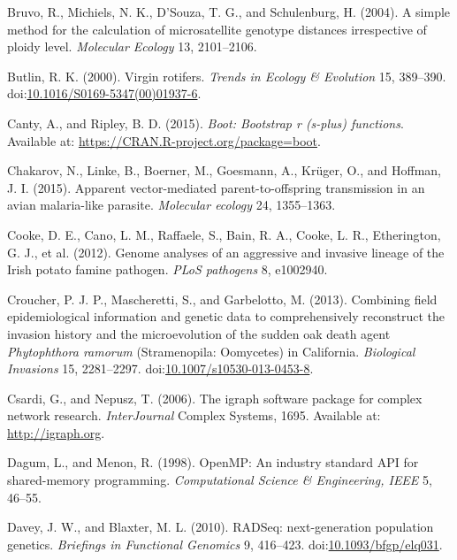 \documentclass[double,12pt]{beavtex}
\begin{document}
  \hypertarget{ref-bruvo2004simple}{}
  Bruvo, R., Michiels, N. K., D'Souza, T. G., and Schulenburg, H. (2004).
  A simple method for the calculation of microsatellite genotype distances
  irrespective of ploidy level. \emph{Molecular Ecology} 13, 2101--2106.
  
  \hypertarget{ref-butlin2000virgin}{}
  Butlin, R. K. (2000). Virgin rotifers. \emph{Trends in Ecology \&
  Evolution} 15, 389--390.
  doi:\href{https://doi.org/10.1016/S0169-5347(00)01937-6}{10.1016/S0169-5347(00)01937-6}.
  
  \hypertarget{ref-canty2015boot}{}
  Canty, A., and Ripley, B. D. (2015). \emph{Boot: Bootstrap r (s-plus)
  functions}. Available at: \url{https://CRAN.R-project.org/package=boot}.
  
  \hypertarget{ref-chakarov2015apparent}{}
  Chakarov, N., Linke, B., Boerner, M., Goesmann, A., Krüger, O., and
  Hoffman, J. I. (2015). Apparent vector-mediated parent-to-offspring
  transmission in an avian malaria-like parasite. \emph{Molecular ecology}
  24, 1355--1363.
  
  \hypertarget{ref-cooke2012genome}{}
  Cooke, D. E., Cano, L. M., Raffaele, S., Bain, R. A., Cooke, L. R.,
  Etherington, G. J., et al. (2012). Genome analyses of an aggressive and
  invasive lineage of the Irish potato famine pathogen. \emph{PLoS
  pathogens} 8, e1002940.
  
  \hypertarget{ref-croucher2013combining}{}
  Croucher, P. J. P., Mascheretti, S., and Garbelotto, M. (2013).
  Combining field epidemiological information and genetic data to
  comprehensively reconstruct the invasion history and the microevolution
  of the sudden oak death agent \emph{Phytophthora ramorum} (Stramenopila:
  Oomycetes) in California. \emph{Biological Invasions} 15, 2281--2297.
  doi:\href{https://doi.org/10.1007/s10530-013-0453-8}{10.1007/s10530-013-0453-8}.
  
  \hypertarget{ref-csardi2006igraph}{}
  Csardi, G., and Nepusz, T. (2006). The igraph software package for
  complex network research. \emph{InterJournal} Complex Systems, 1695.
  Available at: \url{http://igraph.org}.
  
  \hypertarget{ref-dagum1998openmp}{}
  Dagum, L., and Menon, R. (1998). OpenMP: An industry standard API for
  shared-memory programming. \emph{Computational Science \& Engineering,
  IEEE} 5, 46--55.
  
  \hypertarget{ref-davey2010rad}{}
  Davey, J. W., and Blaxter, M. L. (2010). RADSeq: next-generation
  population genetics. \emph{Briefings in Functional Genomics} 9,
  416--423.
  doi:\href{https://doi.org/10.1093/bfgp/elq031}{10.1093/bfgp/elq031}.
  
\end{document}
